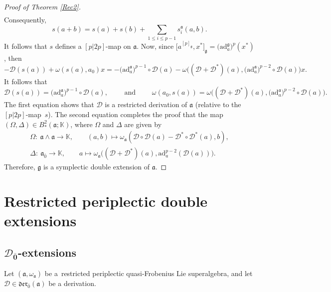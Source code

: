 \documentclass[pdftex]{sigma}
\numberwithin{equation}{section}
\begin{document}
\begin{proof}[Proof of Theorem \ref{Rec2}]
\begin{align*}
\end{align*}
Consequently,
\[
 s(a+b)=s(a)+s(b)+ \sum_{1\leq i \leq p-1}s_i^{\mathfrak{a}}(a,b).
\]
It follows that $s$ defines a $[p|2p]$-map on $\mathfrak{a}$. Now, since $\big[a^{[p]_\mathfrak{g}},x^*\big]_\mathfrak{g}=\bigl(\mathrm{ad}_a^\mathfrak{g}\bigr)^p(x^*)$, then
\[
-\mathscr D (s(a)) + \omega (s(a), a_0)x = - \bigl(\mathrm{ad}_a^\mathfrak{a}\bigr)^{p-1}\circ \mathscr D(a) - \omega \bigl(({\mathscr D}+{\mathscr D}^*)(a), \bigl(\mathrm{ad}_a^\mathfrak{a}\bigr)^{p-2} \circ {\mathscr D}(a)\bigr)x.
\]
It follows that
\[
\mathscr D (s(a)) = \bigl(\mathrm{ad}_a^\mathfrak{a}\bigr)^{p-1}\circ \mathscr D(a),\qquad \text{ and }\qquad
\omega(a_0, s(a)) = \omega \bigl(({\mathscr D}+{\mathscr D}^*)(a),\bigl(\mathrm{ad}_a^\mathfrak{a}\bigr)^{p-2} \circ {\mathscr D}(a)\bigr).
\]
The first equation shows that ${\mathscr D}$ is a restricted derivation of $\mathfrak{a}$ (relative to the $[p|2p]$-map~$s$). The second equation completes the proof that the map $(\Omega,\Delta)\in B^2_*(\mathfrak{a}; \mathbb{K})$, where $\Omega$ and $\Delta$ are given by
\begin{gather*}\label{EOOmega}
\Omega\colon\ \mathfrak{a}\wedge \mathfrak{a} \rightarrow \mathbb{K},\qquad (a,b) \mapsto \omega_\mathfrak{a}( {\mathscr D} \circ {\mathscr D}(a) - {\mathscr D}^* \circ {\mathscr D}^*(a) , b), \\
\Delta\colon\ \mathfrak{a}_{\bar 0} \rightarrow \mathbb{K},\qquad a \mapsto \omega_\mathfrak{a}\bigl(({\mathscr D}+{\mathscr D}^*)(a),\mathrm{ad}_a^{p-2}({\mathscr D}(a))\bigr).
\end{gather*}
Therefore, $\mathfrak g$ is a symplectic double extension of $\mathfrak{a}$.
\end{proof}

\section{Restricted periplectic double extensions}\label{sec4}

\subsection[D\_0-extensions]{$\boldsymbol{{\mathscr D}_{\bar 0}}$-extensions}\label{D0omega1}

Let $(\mathfrak{a}, \omega_\mathfrak{a})$ be a~restricted periplectic quasi-Frobenius Lie superalgebra, and let ${\mathscr D}\in \mathfrak{der}_{\bar 0}(\mathfrak{a})$ be a derivation.
\end{document}
